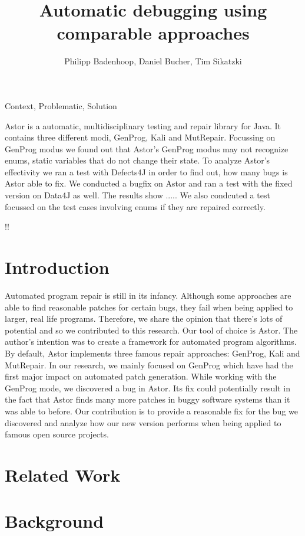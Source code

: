 \documentclass[pdftex,english,oribibl]{llncs}
\title{Automatic debugging using comparable approaches}
\author{Philipp Badenhoop, Daniel Bucher, Tim Sikatzki}
\institute{Humboldt University of Berlin\\Department of Computer Science\\12489 Berlin, Germany}
\makeatletter
\gdef\@keywords{}
\renewenvironment{abstract}{%
  \list{}{\advance\topsep by0.35cm\relax\small%
          \leftmargin=1cm%
          \labelwidth=\z@%
          \listparindent=\z@%
          \itemindent\listparindent%
          \rightmargin\leftmargin}%
          \item[\hskip\labelsep\bfseries\abstractname]}{%
  \if!\@keywords!\else{\item[~]\item[\hskip\labelsep\bfseries\keywordname]\@keywords}\fi%
  \endlist}
\makeatother
\begin{document}
\maketitle

\begin{abstract}
  Context, Problematic, Solution

Astor is a automatic, multidisciplinary testing and repair library for Java. It contains three different modi, GenProg, Kali and MutRepair. Focussing on GenProg modus we found out that Astor's GenProg modus may not recognize enums, static variables that do not change their state.
To analyze Astor's effectivity we ran a test with Defects4J in order to find out, how many bugs is Astor able to fix. We conducted a bugfix on Astor and ran a test with the fixed version on Data4J as well. The results show .....
We also condcuted a test focussed on the test cases involving enums if they are repaired correctly.

\end{abstract}

\section{Introduction}
Automated program repair is still in its infancy.
Although some approaches are able to find reasonable patches for certain bugs, they fail when being applied to larger, real life programs.
Therefore, we share the opinion that there's lots of potential and so we contributed to this research.
Our tool of choice is Astor.
The author's intention was to create a framework for automated program algorithms.
By default, Astor implements three famous repair approaches: GenProg, Kali and MutRepair.
In our research, we mainly focused on GenProg which have had the first major impact on automated patch generation.
While working with the GenProg mode, we discovered a bug in Astor. 
Its fix could potentially result in the fact that Astor finds many more patches in buggy software systems than it was able to before.
Our contribution is to provide a reasonable fix for the bug we discovered and analyze how our new version performs when being applied to famous open source projects.

\section{Related Work}\label{sec:relatedWork}

\section{Background}\label{sec:background}
\end{document}
